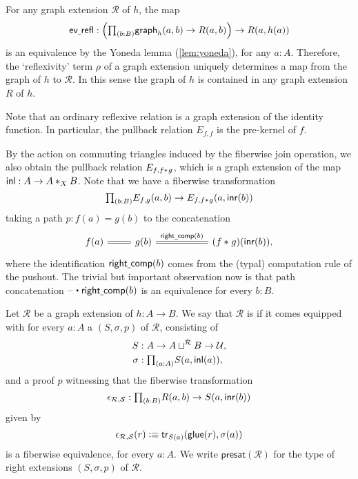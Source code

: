 \begin{rmk}
For any graph extension $\mathcal{R}$ of $h$, the map
\begin{equation*}
\mathsf{ev\usc{}refl}:\Big(\prd{b:B} \mathsf{graph}_h(a,b)\to R(a,b)\Big)\to R(a,h(a))
\end{equation*}
is an equivalence by the Yoneda lemma (\cref{lem:yoneda}), for any $a:A$. Therefore, the `reflexivity' term $\rho$ of a graph extension uniquely determines a map from the graph of $h$ to $\mathcal{R}$. In this sense the graph of $h$ is contained in any graph extension $R$ of $h$. 

Note that an ordinary reflexive relation is a graph extension of the identity function. In particular, the pullback relation $E_{f,f}$ is the pre-kernel of $f$. 
\end{rmk}

By the action on commuting triangles induced by the fiberwise join operation, we also obtain the pullback relation $E_{f,\join{f}{g}}$, which is a graph extension of the map $\inl:A\to \join[X]{A}{B}$. Note that we have a fiberwise transformation
\begin{equation*}
\prd{b:B}E_{f,g}(a,b)\to E_{f,\join{f}{g}}(a,\inr(b))
\end{equation*}
taking a path $p:f(a)=g(b)$ to the concatenation
\begin{equation*}
\begin{tikzcd}
f(a) \arrow[r,equals] & g(b) \arrow[r,equals,"\mathsf{right\usc{}comp}(b)"] &[3em] (\join{f}{g})(\inr(b)),
\end{tikzcd}
\end{equation*}
where the identification $\mathsf{right\usc{}comp}(b)$ comes from the (typal) computation rule of the pushout.
The trivial but important observation now is that path concatenation $\ct{\blank}{\mathsf{right\usc{}comp}(b)}$ is an equivalence for every $b:B$.

\begin{defn}
Let $\mathcal{R}$ be a graph extension of $h:A\to B$. We say that $\mathcal{R}$ is  if it comes equipped with for every $a:A$ a  $(S,\sigma,p)$ of $\mathcal{R}$, consisting of
\begin{align*}
S & : A \to A\sqcup^{\mathcal{R}}B\to\UU, \\
\sigma & : \prd{a:A} S(a,\inl(a)),
\end{align*}
and a proof $p$ witnessing that the fiberwise transformation
\begin{equation*}
\epsilon_{\mathcal{R},\mathcal{S}}:\prd{b:B} R(a,b)\to S(a,\inr(b))
\end{equation*}
given by 
\begin{equation*}
\epsilon_{\mathcal{R},\mathcal{S}}(r)\defeq \mathsf{tr}_{S(a)}(\glue(r),\sigma(a))
\end{equation*}
is a fiberwise equivalence, for every $a:A$. We write $\mathsf{presat}(\mathcal{R})$ for the type of right extensions $(S,\sigma,p)$ of $\mathcal{R}$.
\end{defn}

